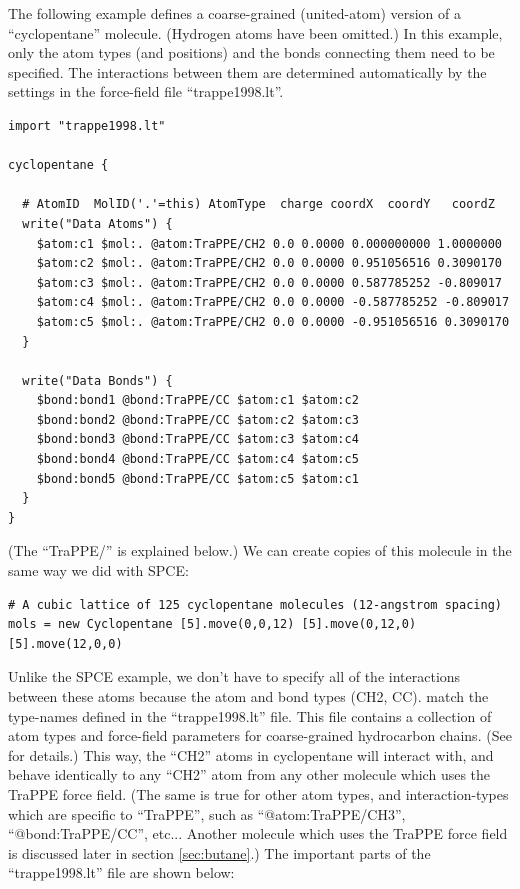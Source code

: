 \documentclass[11pt]{article}
\begin{document}
The following example defines a coarse-grained (united-atom)
version of a ``cyclopentane'' molecule. (Hydrogen atoms have been omitted.)
In this example, only the atom types (and positions) and the bonds 
connecting them need to be specified.  
The interactions between them are determined automatically 
by the settings in the force-field file ``trappe1998.lt''.
\begin{verbatim}
import "trappe1998.lt"

cyclopentane {

  # AtomID  MolID('.'=this) AtomType  charge coordX  coordY   coordZ
  write("Data Atoms") {
    $atom:c1 $mol:. @atom:TraPPE/CH2 0.0 0.0000 0.000000000 1.0000000
    $atom:c2 $mol:. @atom:TraPPE/CH2 0.0 0.0000 0.951056516 0.3090170
    $atom:c3 $mol:. @atom:TraPPE/CH2 0.0 0.0000 0.587785252 -0.809017
    $atom:c4 $mol:. @atom:TraPPE/CH2 0.0 0.0000 -0.587785252 -0.809017
    $atom:c5 $mol:. @atom:TraPPE/CH2 0.0 0.0000 -0.951056516 0.3090170
  }

  write("Data Bonds") {
    $bond:bond1 @bond:TraPPE/CC $atom:c1 $atom:c2
    $bond:bond2 @bond:TraPPE/CC $atom:c2 $atom:c3
    $bond:bond3 @bond:TraPPE/CC $atom:c3 $atom:c4
    $bond:bond4 @bond:TraPPE/CC $atom:c4 $atom:c5
    $bond:bond5 @bond:TraPPE/CC $atom:c5 $atom:c1
  }
}
\end{verbatim}
(The ``TraPPE/'' is explained below.)
We can create copies of this molecule in the same way we did with SPCE:
\begin{verbatim}
# A cubic lattice of 125 cyclopentane molecules (12-angstrom spacing)
mols = new Cyclopentane [5].move(0,0,12) [5].move(0,12,0) [5].move(12,0,0)
\end{verbatim}
Unlike the SPCE example, we don't have to specify all of the interactions 
between these atoms because the atom and bond types (CH2, CC).
match the type-names defined in the ``trappe1998.lt'' file.
This file contains a collection of atom types and
force-field parameters for coarse-grained hydrocarbon chains.
(See \cite{TraPPE} for details.)
This way, the ``CH2'' atoms in cyclopentane will interact with, 
and behave identically to any ``CH2'' atom from any other molecule 
which uses the TraPPE force field.
(The same is true for other atom types, and interaction-types 
 which are specific to ``TraPPE'', such as
``@atom:TraPPE/CH3'', ``@bond:TraPPE/CC'', etc...
Another molecule which uses the TraPPE force field is discussed 
later in section \ref{sec:butane}.)
The important parts of the ``trappe1998.lt'' file are shown below:
\end{document}
